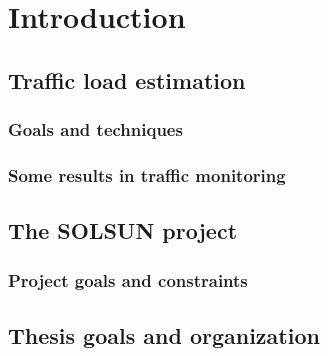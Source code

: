 \chapter*{Introduction}

\section{Traffic load estimation}
\subsection{Goals and techniques}
\subsection{Some results in traffic monitoring}

\section{The SOLSUN project}
\subsection{Project goals and constraints}

\section{Thesis goals and organization}

